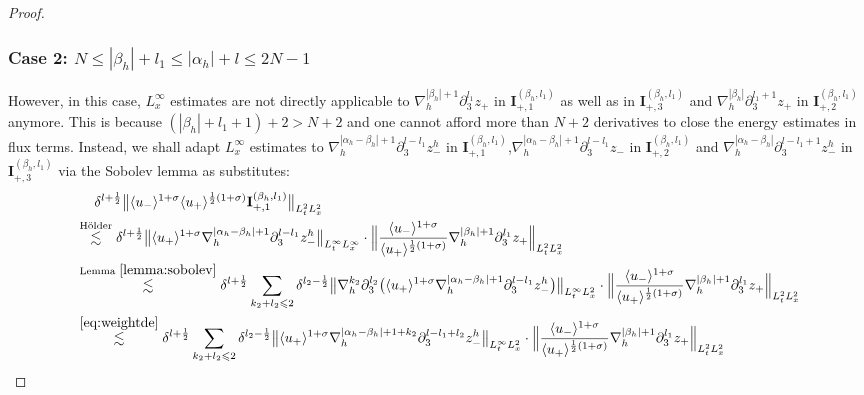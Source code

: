 \documentclass[10pt,reqno]{amsart}
\numberwithin{equation}{section}
\begin{document}
\begin{proof}
\subsubsection*{\bf Case 2:  $N\leqslant|\beta_h|+l_1\leqslant|\alpha_h|+l\leqslant 2N-1$} 
	However, in this case, $L^\infty_x$ estimates are not directly applicable to $\nabla_h^{|\beta_h|+1}\partial_3^{l_1} z_{+}$ in $\mathbf{I}_{+,1}^{(\beta_h,l_1)}$ as well as in $\mathbf{I}_{+,3}^{(\beta_h,l_1)}$  and $\nabla_h^{|\beta_h|}\partial_3^{l_1+1} z_{+}$ in $\mathbf{I}_{+,2}^{(\beta_h,l_1)}$ anymore. This is because $(|\beta_h|+l_1+1)+2> N+2$ and one cannot afford more than $N+2$ derivatives to close the energy estimates in flux terms.  
	 Instead, we shall adapt $L^\infty_x$ estimates to $\nabla_h^{|\alpha_h-\beta_h|+1}\partial_3^{l-l_1}z_-^h$ in $\mathbf{I}_{+,1}^{(\beta_h,l_1)}$,$\nabla_h^{|\alpha_h-\beta_h|+1}\partial_3^{l-l_1}z_-$ in $\mathbf{I}_{+,2}^{(\beta_h,l_1)}$  and  $\nabla_h^{|\alpha_h-\beta_h|}\partial_3^{l-l_1+1}z_-^h$ in $\mathbf{I}_{+,3}^{(\beta_h,l_1)}$  via the Sobolev lemma as substitutes:
\begin{align*}
&\ \ \ \ \delta^{l+\frac{1}{2}}\big\|\langle u_-\rangle^{1+\sigma}\langle u_+\rangle^{\frac{1}{2}(1+\sigma)}\mathbf{I}_{+,1}^{(\beta_h,l_1)}\big\|_{L^2_tL^2_x}\\
&\stackrel{\text{H\"older}}{\lesssim} \delta^{l+\frac{1}{2}}\big\|\langle u_+\rangle^{1+\sigma}\nabla_h^{|\alpha_h-\beta_h|+1}\partial_3^{l-l_1}z_-^h\big\|_{L^\infty_tL^\infty_x}\cdot \Big\|\frac{\langle u_-\rangle^{1+\sigma}}{\langle u_+\rangle^{\frac{1}{2}(1+\sigma)}}\nabla_h^{|\beta_h|+1}\partial_3^{l_1}z_+\Big\|_{L^2_tL^2_x}\\
&\stackrel{\text{Lemma } \ref{lemma:sobolev}}{\lesssim}\delta^{l+\frac{1}{2}}
\sum_{k_2+l_2\leqslant 2}\delta^{l_2-\frac{1}{2}}\big\|\nabla_h^{k_2}\partial_3^{l_2}\big(\langle u_+\rangle^{1+\sigma}\nabla_h^{|\alpha_h-\beta_h|+1}\partial_3^{l-l_1}z_-^h\big)\big\|_{L^\infty_tL^2_x}\cdot \Big\|\frac{\langle u_-\rangle^{1+\sigma}}{\langle u_+\rangle^{\frac{1}{2}(1+\sigma)}}\nabla_h^{|\beta_h|+1}\partial_3^{l_1}z_+\Big\|_{L^2_tL^2_x}\\
&\stackrel{\eqref{eq:weightde}}{\lesssim}	\delta^{l+\frac{1}{2}}\sum_{k_2+l_2\leqslant 2}\delta^{l_2-\frac{1}{2}}\big\|\langle u_+\rangle^{1+\sigma}\nabla_h^{|\alpha_h-\beta_h|+1+k_2}\partial_3^{l-l_1+l_2}z_-^h\big\|_{L^\infty_tL^2_x}\cdot \Big\|\frac{\langle u_-\rangle^{1+\sigma}}{\langle u_+\rangle^{\frac{1}{2}(1+\sigma)}}\nabla_h^{|\beta_h|+1}\partial_3^{l_1}z_+\Big\|_{L^2_tL^2_x}\\

\end{align*}
\end{proof}
\end{document}
